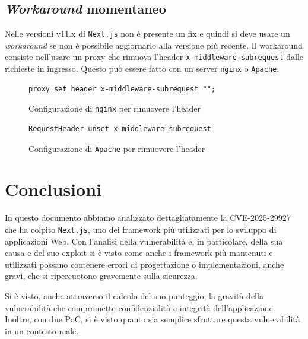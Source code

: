 \documentclass[a4paper,oneside,12pt]{report}
\begin{document}
\section{\textit{Workaround} momentaneo}
\label{sec:workaround-momentaneo}

Nelle versioni v11.x di \texttt{Next.js} non \`e presente un fix e quindi si deve usare un \textit{workaround} se non \`e possibile aggiornarlo alla versione pi\`u recente. Il workaround consiste nell'usare un proxy che rimuova l'header \texttt{x-middleware-subrequest} dalle richieste in ingresso. Questo pu\`o essere fatto con un server \texttt{nginx} o \texttt{Apache}.

\begin{figure}[H]
	\centering
	\begin{verbatim}
proxy_set_header x-middleware-subrequest "";
	\end{verbatim}
	\caption{Configurazione di \texttt{nginx} per rimuovere l'header}
	\label{fig:nginx-workaround}
\end{figure}

\begin{figure}[H]
	\centering
	\begin{verbatim}
RequestHeader unset x-middleware-subrequest
	\end{verbatim}
	\caption{Configurazione di \texttt{Apache} per rimuovere l'header}
	\label{fig:apache-workaround}
\end{figure}

\chapter*{Conclusioni}
\label{chap:conclusioni}
\justifying

In questo documento abbiamo analizzato dettagliatamente la CVE-2025-29927 che ha colpito \texttt{Next.js}, uno dei framework pi\`u utilizzati per lo sviluppo di applicazioni Web. Con l'analisi della vulnerabilit\`a e, in particolare, della sua causa e del suo exploit si \`e visto come anche i framework pi\`u mantenuti e utilizzati possano contenere errori di progettazione o implementazioni, anche gravi, che si ripercuotono gravemente sulla sicurezza.

Si \`e visto, anche attraverso il calcolo del suo punteggio, la gravit\`a della vulnerabilit\`a che compromette confidenzialit\`a e integrit\`a dell'applicazione. Inoltre, con due PoC, si \`e visto quanto sia semplice sfruttare questa vulnerabilit\`a in un contesto reale.
\end{document}
